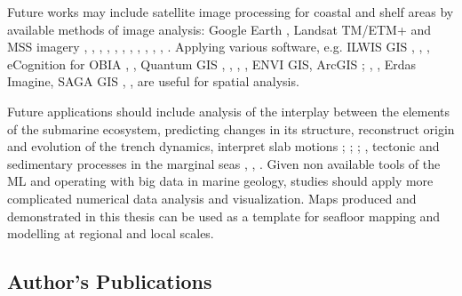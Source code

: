 \documentclass[11pt,a4paper]{report}
\begin{document}
{Future works may include satellite image processing for coastal and shelf areas by available methods of image analysis: Google Earth \cite{Lemenkova201510}, Landsat TM/ETM+ and MSS imagery \cite{Lemenkova2014a}, \cite{Lemenkova2014e}, \cite{Lemenkova201509}, \cite{Lemenkova201515}, \cite{Lemenkova2014j}, \cite{Lemenkova201512}, \cite{Lemenkova201516}, \cite{Lemenkova201524}, \cite{Lemenkova201551}, \cite{Lemenkova202014}, , \cite{Lemenkova202019}. Applying various software, e.g. ILWIS GIS \cite{Lemenkova201520}, \cite{Lemenkova201523}, \cite{Lemenkova201556}, eCognition for OBIA \cite{Lemenkova201522}, \cite{Lemenkova201542}, Quantum GIS \cite{Lemenkova202010}, \cite{Lemenkova201530}, \cite{Lemenkova201531}, \cite{Lemenkova201537}, ENVI GIS, ArcGIS \cite{Lemenkova2004a}; \cite{Lemenkova201568}, \cite{Lemenkova2005b2}, Erdas Imagine, SAGA GIS \cite{Lemenkova202014}, \cite{Lemenkova202021}, \cite{Lemenkova202024} are useful for spatial analysis.

Future applications should include analysis of the interplay between the elements of the submarine ecosystem, predicting changes in its structure, reconstruct origin and evolution of the trench dynamics, interpret slab motions \cite{Sdroliasetal2004}; \cite{Otsuki1990}; \cite{Nakakukietal2008}; \cite{HildeLee1984}, tectonic and sedimentary processes in the marginal seas \cite{Lemenkova2006e}, \cite{Lemenkova2006c}, \cite{Lemenkova2006a}. Given non available tools of the \ac{ML} and operating with big data in marine geology, studies should apply more complicated numerical data analysis and visualization. Maps produced and demonstrated in this thesis can be used as a template for seafloor mapping and modelling at regional and local scales. 

\vspace{1em}

\begin{refsection}
\chapter*{Author's Publications}\label{chp:7}
		

\end{refsection}}
\end{document}
